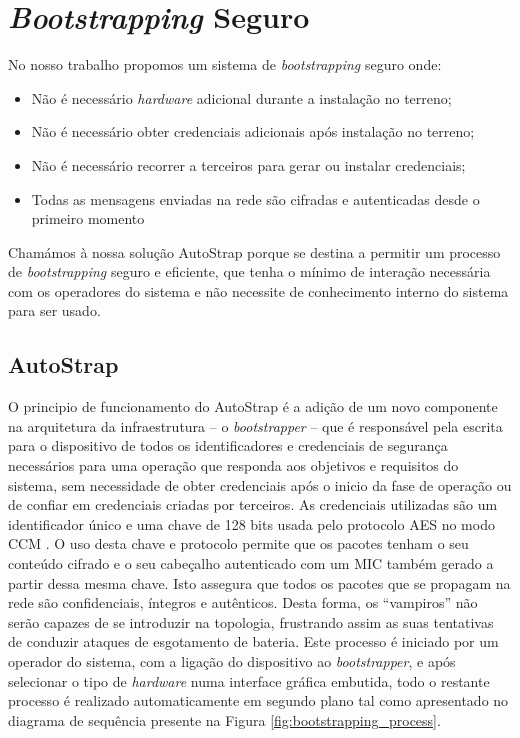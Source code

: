\documentclass{llncs}
\begin{document}
\section{\emph{Bootstrapping} Seguro}
\label{sec:secure_bootstrapping}
No nosso trabalho propomos um sistema de \textit{bootstrapping} seguro onde:
\begin{itemize}
	\item{Não é necessário \textit{hardware} adicional durante a instalação no terreno};
	\item{Não é necessário obter credenciais adicionais após instalação no terreno};
	\item{Não é necessário recorrer a terceiros para gerar ou instalar credenciais};
	\item{Todas as mensagens enviadas na rede são cifradas e autenticadas desde o primeiro momento}
\end{itemize}
	
Chamámos à nossa solução AutoStrap porque se destina a permitir um processo de \textit{bootstrapping} seguro e eficiente, que tenha o mínimo de interação necessária com os operadores do sistema e não necessite de conhecimento interno do sistema para ser usado. 

\subsection{AutoStrap}
\label{sec:implementation_details}
O principio de funcionamento do AutoStrap é a adição de um novo componente na arquitetura da infraestrutura -- o \textit{bootstrapper} -- que é responsável pela escrita para o dispositivo de todos os identificadores e credenciais de segurança necessários para uma operação que responda aos objetivos e requisitos do sistema, sem necessidade de obter credenciais após o inicio da fase de operação ou de confiar em credenciais criadas por terceiros. 
As credenciais utilizadas são um identificador único e uma chave de 128 bits usada pelo protocolo \ac{AES} \cite{Fips2001} no modo \ac{CCM} %
\cite{Corp2005}. 
O uso desta chave e protocolo permite que os pacotes tenham o seu conteúdo cifrado e o seu cabeçalho autenticado com um \ac{MIC} também gerado a partir dessa mesma chave. Isto assegura que todos os pacotes que se propagam na rede são confidenciais, íntegros e autênticos. 
Desta forma, os ``vampiros'' não serão capazes de se introduzir na topologia, frustrando assim as suas tentativas de conduzir ataques de esgotamento de bateria. 
Este processo é iniciado por um operador do sistema, com a ligação do dispositivo ao \textit{bootstrapper}, e após selecionar o tipo de \textit{hardware} numa interface gráfica embutida, todo o restante processo é realizado automaticamente em segundo plano tal como apresentado no diagrama de sequência presente na Figura \ref{fig:bootstrapping_process}.
\end{document}
